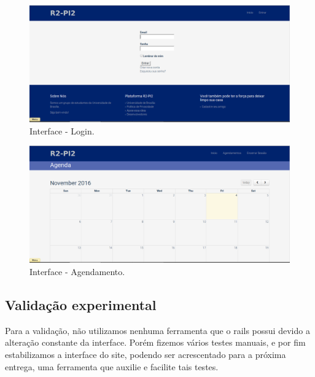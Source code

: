 \begin{figure}[H]
	\centering
	\includegraphics[scale=0.3]{figuras/login.png}
	\caption{Interface - Login.}
	\label{img:login}
\end{figure}

\begin{figure}[H]
	\centering
	\includegraphics[scale=0.3]{figuras/agendamento.png}
	\caption{Interface - Agendamento.}
	\label{img:agendamento}
\end{figure}


\subsection{Validação experimental} %
	\label{sub:validação_experimental}

  Para a validação, não utilizamos nenhuma ferramenta que o rails possui devido a alteração constante da interface. Porém fizemos vários testes manuais,
 e por fim estabilizamos a interface do site, podendo ser acrescentado para a próxima entrega, uma ferramenta que auxilie e facilite tais testes.
